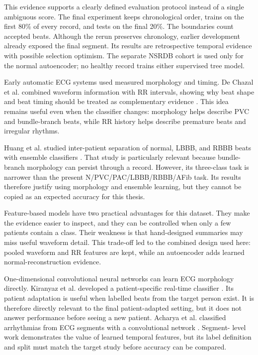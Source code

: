 This evidence supports a clearly defined evaluation protocol instead of a
single ambiguous score. The final experiment keeps chronological order, trains
on the first 80\% of every record, and tests on the final 20\%. The boundaries count accepted beats. Although the rerun preserves chronology,
earlier development already exposed the final segment. Its results are
retrospective temporal evidence with possible selection optimism. The separate NSRDB
cohort is used only for the normal autoencoder; no healthy record trains either
supervised tree model.

Early automatic ECG systems used measured morphology and timing. De Chazal et
al. combined waveform information with RR intervals, showing why beat shape and
beat timing should be treated as complementary evidence
\cite{dechazal2004heartbeat}. This idea remains useful even when the classifier
changes: morphology helps describe PVC and bundle-branch beats, while RR history
helps describe premature beats and irregular rhythms.

Huang et al. studied inter-patient separation of normal, LBBB, and RBBB beats
with ensemble classifiers \cite{huang2014bbb}. That study is particularly
relevant because bundle-branch morphology can persist through a record. However,
its three-class task is narrower than the present N/PVC/PAC/LBBB/RBBB/AFib task.
Its results therefore justify using morphology and ensemble learning, but they
cannot be copied as an expected accuracy for this thesis.

Feature-based models have two practical advantages for this dataset. They make
the evidence easier to inspect, and they can be controlled when only a few
patients contain a class. Their weakness is that hand-designed summaries may
miss useful waveform detail. This trade-off led to the combined design used
here: pooled waveform and RR features are kept, while an autoencoder adds
learned normal-reconstruction evidence.

One-dimensional convolutional neural networks can learn ECG morphology directly.
Kiranyaz et al. developed a patient-specific real-time classifier
\cite{kiranyaz2016ecgcnn}. Its patient adaptation is useful when labelled beats
from the target person exist. It is therefore directly relevant to the
final patient-adapted setting, but it does not answer performance before
seeing a new patient. Acharya et al. classified arrhythmias
from ECG segments with a convolutional network \cite{acharya2017cnn}. Segment-
level work demonstrates the value of learned temporal features, but its label
definition and split must match the target study before accuracy can be compared.

